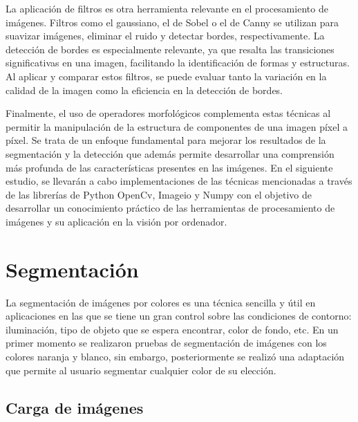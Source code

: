 \documentclass[a4paper,12pt]{article}
\begin{document}
{\vspace{0.5cm}
La aplicación de filtros es otra herramienta relevante en el procesamiento de imágenes. Filtros como el gaussiano, el de
Sobel o el de Canny se utilizan para suavizar imágenes, eliminar el ruido y detectar bordes, respectivamente. La detección de bordes
es especialmente relevante, ya que resalta las transiciones significativas en una imagen, facilitando la identificación de 
 formas y estructuras. Al aplicar y comparar estos filtros, se puede evaluar tanto la variación en la calidad de la imagen como
la eficiencia en la detección de bordes.

\vspace{0.5cm}
Finalmente, el uso de operadores morfológicos complementa estas técnicas al permitir la manipulación de la estructura de componentes
de una imagen píxel a píxel. Se trata de un enfoque fundamental para mejorar los resultados de la segmentación y la 
detección que además permite desarrollar una comprensión más profunda de las características presentes en las imágenes. En el siguiente estudio, 
se llevarán a cabo implementaciones de las técnicas mencionadas a través de las librerías de Python OpenCv, Imageio y Numpy con el objetivo de
desarrollar un conocimiento práctico de las herramientas de procesamiento de imágenes y su aplicación en la visión por ordenador.

\newpage


\section{Segmentación}


\vspace{1cm}

La segmentación de imágenes por colores es una técnica sencilla y útil en aplicaciones en las que se tiene un gran control
sobre las condiciones de contorno: iluminación, tipo de objeto que se espera encontrar, color de fondo, etc.
En un primer momento se realizaron pruebas de segmentación de imágenes con los colores naranja y blanco, sin embargo, posteriormente
se realizó una adaptación que permite al usuario segmentar cualquier color de su elección.

\vspace{0.5cm}

\subsection{Carga de imágenes}

}
\end{document}
